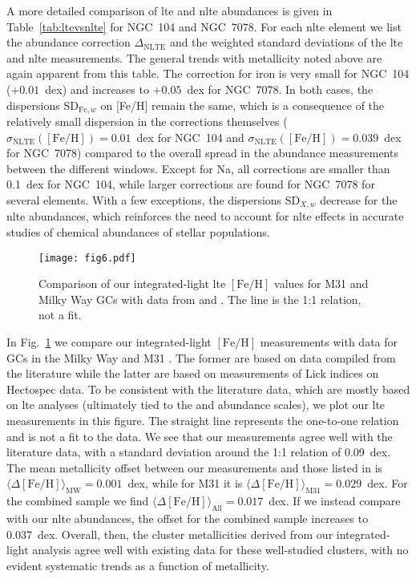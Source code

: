 \documentclass{aa}
\begin{document}
A more detailed comparison of \ac{lte} and \ac{nlte} abundances is given in Table~\ref{tab:ltevsnlte} for NGC~104 and NGC~7078. For each \ac{nlte} element we list the abundance correction $\Delta_\mathrm{NLTE}$ and the weighted standard deviations of the \ac{lte} and \ac{nlte} measurements. The general trends with metallicity noted above are again apparent from this table. The correction for iron is very small for NGC~104 ($+0.01$~dex) and increases to $+0.05$~dex for NGC~7078. In both cases, the dispersions SD$_{\mathrm{Fe},w}$ on [Fe/H] remain the same, which is a consequence of the relatively small dispersion in the corrections themselves ($\sigma_\mathrm{NLTE}(\mathrm{[Fe/H]}) = 0.01$~dex for NGC~104 and $\sigma_\mathrm{NLTE}(\mathrm{[Fe/H]}) =0.039$~dex for NGC~7078) compared to the overall spread in the abundance measurements between the different windows. Except for Na, all corrections are smaller than 0.1~dex for NGC~104, while larger corrections are found for NGC~7078 for several elements. With a few exceptions, the dispersions SD$_{X,w}$ decrease for the \ac{nlte} abundances, which reinforces the need to account for \ac{nlte} effects in accurate studies of chemical abundances of stellar populations.


\begin{figure}
\centering
\texttt{[image: fig6.pdf]}
\caption{\label{fig:cmpfeh}Comparison of our integrated-light \ac{lte} $\mathrm{[Fe/H]}$ values for M31 and Milky Way GCs  with data from \citet{Caldwell2011} and \citet{Harris1996}. The line is the 1:1 relation, not a fit. }
\end{figure}

In Fig.~\ref{fig:cmpfeh} we compare our integrated-light $\mathrm{[Fe/H]}$ measurements with data for GCs in the Milky Way \citep[][2010 revision]{Harris1996} and M31 \citep{Caldwell2011}. The former are based on data compiled from the literature while the latter are based on measurements of Lick indices on Hectospec data. To be consistent with the literature data, which are mostly based on \ac{lte} analyses (ultimately tied to the  and \citealt{Carretta1997} abundance scales), we plot our \ac{lte} measurements in this figure. 
The straight line represents the one-to-one relation and is not a fit to the data. We see that our measurements agree well with the literature data, with a standard deviation around the 1:1 relation of 0.09~dex. The mean metallicity offset between our measurements and those listed in \citet{Harris1996} is
$\langle \Delta \mathrm{[Fe/H]}\rangle_\mathrm{MW} = 0.001$~dex, while for M31 it is
$\langle \Delta \mathrm{[Fe/H]}\rangle_\mathrm{M31} = 0.029$~dex. For the combined sample we find $\langle \Delta \mathrm{[Fe/H]}\rangle_\mathrm{All} = 0.017$~dex.
If we instead compare with our \ac{nlte} abundances, the offset for the combined sample increases to 0.037~dex.
Overall, then, the cluster metallicities derived from our integrated-light analysis agree well with existing data for these well-studied clusters, with no evident systematic trends as a function of metallicity.  
\end{document}
